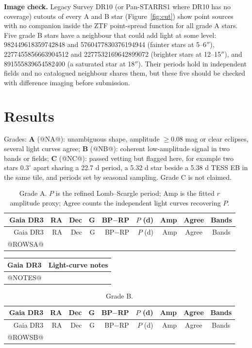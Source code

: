 \documentclass[11pt]{article}
\begin{document}
\textbf{Image check.} Legacy Survey DR10 (or Pan-STARRS1 where DR10 has no coverage) cutouts of every A and B star (Figure~\ref{fig:cut}) show point sources with no companion inside the ZTF point-spread function for all grade A stars. Five grade B stars have a neighbour that could add light at some level: 982449618359742848 and 5760477830376194944 (fainter stars at 5--6$''$), 2277455856663904512 and 2277532169642899072 (brighter stars at 12--15$''$), and 891555839654582400 (a saturated star at 18$''$). Their periods hold in independent fields and no catalogued neighbour shares them, but these five should be checked with difference imaging before submission.

\section{Results}
Grades: \textbf{A} (@NA@): unambiguous shape, amplitude $\ge0.08$ mag or clear eclipses, several light curves agree; \textbf{B} (@NB@): coherent low-amplitude signal in two bands or fields; \textbf{C} (@NC@): passed vetting but flagged here, for example two stars $0.3^\circ$ apart sharing a 22.7 d period, a 5.32 d star beside a 5.38 d TESS EB in the same tile, and periods set by seasonal sampling. Grade C is not claimed.

{\small\setlength{\tabcolsep}{3.5pt}
\begin{longtable}{rrrrrrrcc}
\caption{Grade A. $P$ is the refined Lomb--Scargle period; Amp is the fitted $r$ amplitude proxy; Agree counts the independent light curves recovering $P$.}\\
\toprule Gaia DR3 & RA & Dec & G & BP$-$RP & $P$ (d) & Amp & Agree & Bands\\\midrule\endfirsthead
\toprule Gaia DR3 & RA & Dec & G & BP$-$RP & $P$ (d) & Amp & Agree & Bands\\\midrule\endhead
@ROWSA@
\bottomrule\end{longtable}}

{\small
\begin{longtable}{>{\raggedright}p{4.2cm}p{11cm}}
\toprule Gaia DR3 & Light-curve notes\\\midrule
@NOTES@
\bottomrule\end{longtable}}

{\small\setlength{\tabcolsep}{3.5pt}
\begin{longtable}{rrrrrrrcc}
\caption{Grade B.}\\
\toprule Gaia DR3 & RA & Dec & G & BP$-$RP & $P$ (d) & Amp & Agree & Bands\\\midrule\endfirsthead
\toprule Gaia DR3 & RA & Dec & G & BP$-$RP & $P$ (d) & Amp & Agree & Bands\\\midrule\endhead
@ROWSB@
\bottomrule\end{longtable}}
\end{document}
